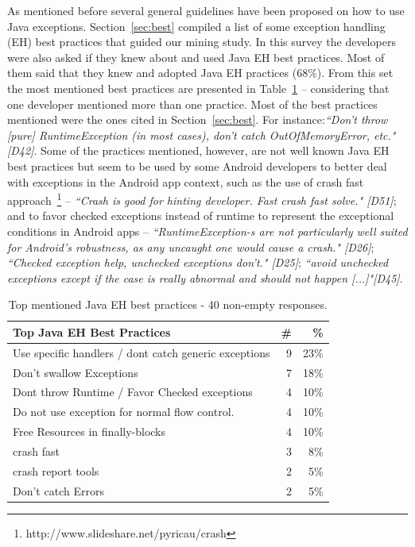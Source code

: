 
As mentioned before several general guidelines have been proposed on how to
use Java exceptions. Section~\ref{sec:best}  compiled a list of some exception handling (EH) best practices that guided our mining study. In this survey the developers were also asked if they knew about and used Java EH best practices. Most of them said that they knew and adopted Java EH practices (68\%). From this set the most mentioned best practices are presented in Table~\ref{tab:javapractices} -- considering that one developer mentioned more than one practice. Most of the best practices mentioned were the ones cited in Section~\ref{sec:best}. For instance:\emph{``Don't throw [pure] RuntimeException (in most cases), don't catch OutOfMemoryError, etc." [D42]}. Some of the practices mentioned, however, are not well known Java EH best practices but seem to be used by some Android developers to better deal with exceptions in the Android app context, such as the use of crash fast approach~\footnote{http://www.slideshare.net/pyricau/crash} -- \emph{``Crash is good for hinting developer. Fast crash fast solve." [D51]}; and to favor checked exceptions instead of runtime to represent the exceptional conditions in Android apps -- \emph{``RuntimeException-s are not particularly well suited for Android's robustness, as any uncaught one would cause a crash." [D26]}; \emph{``Checked exception help, unchecked exceptions don't." [D25]}; \emph{``avoid unchecked exceptions except if the case is really abnormal and should not happen [...]"[D45]}.

\begin{table}
\scriptsize
\centering
\begin{tabular}{lrr}
\hline
\bfseries{Top Java EH Best Practices} & \bfseries{\#} & \bfseries{\%} \\
\hline
Use specific handlers / dont catch generic exceptions	& 9 & 23\% \\
Don't swallow Exceptions	 & 7 & 18\% \\
Dont throw Runtime / Favor Checked exceptions & 4 &	10\% \\
Do not use exception for normal  flow control. &	4 &	10\% \\
Free Resources in finally-blocks	& 4	& 10\% \\
crash fast	 & 3 &	8\% \\
crash report tools	&  2 &	5\% \\
Don't catch Errors 	&  2 &	5\% \\
\hline
\end{tabular}
\caption{Top mentioned Java EH best practices -  40 non-empty responses. }
\label{tab:javapractices}
\end{table}			
				
